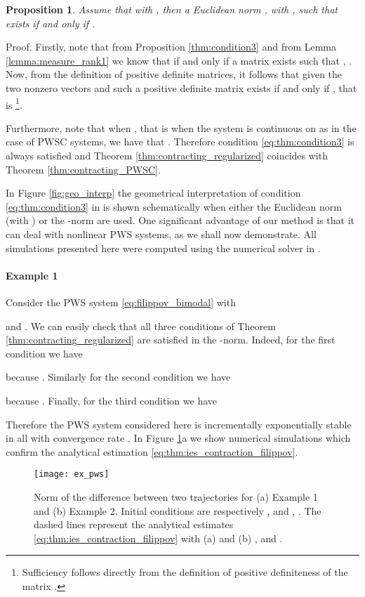 \documentclass[twocolumn]{autart}
\newtheorem{proposition}{Proposition}
\begin{document}
\begin{proposition}
Assume that  with , then a Euclidean norm , with , such that  exists if and only if .
\end{proposition}
\begin{pf*}{Proof.}
Firstly, note that from Proposition \ref{thm:condition3} and from Lemma \ref{lemma:measure_rank1} we know that  if and only if a matrix  exists such that , . Now, from the definition of positive definite matrices, it follows that given the two nonzero vectors  and  such a positive definite matrix  exists if and only if , that is \footnote{Sufficiency follows directly from the definition of positive definiteness of the matrix .}.
\end{pf*}
Furthermore, note that when , that is when the system is continuous on  as in the case of PWSC systems,  we have that . Therefore condition \eqref{eq:thm:condition3} is always satisfied and Theorem \ref{thm:contracting_regularized} coincides with Theorem \ref{thm:contracting_PWSC}.

In Figure \ref{fig:geo_interp} the geometrical interpretation of condition \eqref{eq:thm:condition3} in  is shown schematically when either the Euclidean norm (with ) or the -norm are used.
One significant advantage of our method is that it can deal with nonlinear PWS systems, as we shall now demonstrate. 
All simulations presented here were computed using the numerical solver in \citep{piiroinen2008event}.


\paragraph*{Example 1}
Consider the PWS system \eqref{eq:filippov_bimodal} with

and . We can easily check that all three conditions of Theorem \ref{thm:contracting_regularized} are satisfied in the -norm. Indeed, for the first condition we have

because . Similarly for the second condition we have

because . Finally, for the third condition we have

Therefore the PWS system considered here is incrementally exponentially stable in all  with convergence rate . In Figure \ref{fig:ex_pws}a we show numerical simulations which confirm the analytical estimation \eqref{eq:thm:ies_contraction_filippov}.
\begin{figure}[!t]
\begin{center}
\texttt{[image: ex\_pws]}
\caption{ {Norm of the difference between two trajectories for (a) Example 1 and (b) Example 2. Initial conditions are respectively ,  and , . The dashed lines represent the analytical estimates \eqref{eq:thm:ies_contraction_filippov} with (a)  and (b) , and .}}
\label{fig:ex_pws}
\end{center}
\end{figure}
\end{document}
